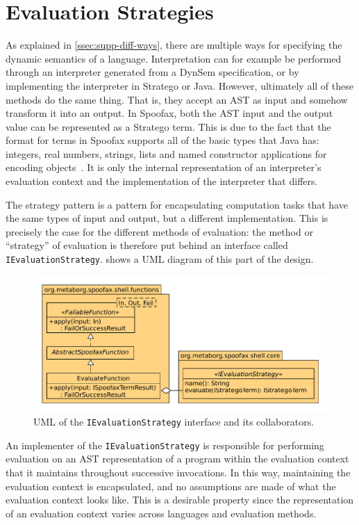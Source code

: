 \section{Evaluation Strategies}
\label{sec:eval-strat}
As explained in \cref{ssec:supp-diff-ways}, there are multiple ways for
specifying the dynamic semantics of a language. Interpretation can for example
be performed through an interpreter generated from a DynSem specification, or by
implementing the interpreter in Stratego or Java. However, ultimately all of
these methods do the same thing. That is, they accept an AST as input and
somehow transform it into an output. In Spoofax, both the AST input and the
output value can be represented as a Stratego term. This is due to the fact that
the format for terms in Spoofax supports all of the basic types that Java has:
integers, real numbers, strings, lists and named constructor applications for
encoding objects~\cite{Brand00}. It is only the internal representation of an
interpreter's evaluation context and the implementation of the interpreter that
differs.

The strategy pattern is a pattern for encapsulating computation tasks that have
the same types of input and output, but a different implementation. This is
precisely the case for the different methods of evaluation: the method or
``strategy'' of evaluation is therefore put behind an interface called
\texttt{IEvaluationStrategy}.  shows a UML diagram
of this part of the design.

\begin{figure}[b]
  \centering
  \includegraphics[width=\textwidth]{uml-eval-strat}
  \caption{UML of the \texttt{IEvaluationStrategy} interface and its
    collaborators.}
  \label{fig:uml-eval-strat}
\end{figure}

An implementer of the \texttt{IEvaluationStrategy} is responsible for performing
evaluation on an AST representation of a program within the evaluation context
that it maintains throughout successive invocations. In this way, maintaining
the evaluation context is encapsulated, and no assumptions are made of what the
evaluation context looks like. This is a desirable property since the
representation of an evaluation context varies across languages and evaluation
methods.

